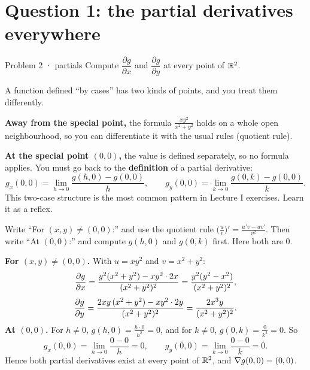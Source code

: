 \section{Question 1: the partial derivatives everywhere}

\begin{question}{Problem 2 \;·\; partials}
Compute $\dfrac{\partial g}{\partial x}$ and $\dfrac{\partial g}{\partial y}$ at every point of $\mathbb{R}^2$.
\end{question}

\begin{lesson}
A function defined ``by cases'' has two kinds of points, and you treat them differently.

\textbf{Away from the special point,} the formula $\frac{xy^2}{x^2+y^2}$ holds on a whole open
neighbourhood, so you can differentiate it with the usual rules (quotient rule).

\textbf{At the special point $(0,0)$,} the value is defined separately, so no formula applies. You
must go back to the \textbf{definition} of a partial derivative:
\[
  g_x(0,0)=\lim_{h\to0}\frac{g(h,0)-g(0,0)}{h},\qquad g_y(0,0)=\lim_{k\to0}\frac{g(0,k)-g(0,0)}{k}.
\]
This two-case structure is the most common pattern in Lecture I exercises. Learn it as a reflex.
\end{lesson}

\begin{howto}
Write ``For $(x,y)\ne(0,0)$:'' and use the quotient rule $\big(\frac uv\big)'=\frac{u'v-uv'}{v^2}$.
Then write ``At $(0,0)$:'' and compute $g(h,0)$ and $g(0,k)$ first. Here both are $0$.
\end{howto}

\begin{answer}
\textbf{For $(x,y)\ne(0,0)$.} With $u=xy^2$ and $v=x^2+y^2$:
\[
  \frac{\partial g}{\partial x}=\frac{y^2(x^2+y^2)-xy^2\cdot2x}{(x^2+y^2)^2}=\frac{y^2(y^2-x^2)}{(x^2+y^2)^2},
\]
\[
  \frac{\partial g}{\partial y}=\frac{2xy\,(x^2+y^2)-xy^2\cdot2y}{(x^2+y^2)^2}=\frac{2x^3y}{(x^2+y^2)^2}.
\]
\textbf{At $(0,0)$.} For $h\ne0$, $g(h,0)=\frac{h\cdot0}{h^2}=0$, and for $k\ne0$, $g(0,k)=\frac{0}{k^2}=0$. So
\[
  g_x(0,0)=\lim_{h\to0}\frac{0-0}{h}=0,\qquad g_y(0,0)=\lim_{k\to0}\frac{0-0}{k}=0 .
\]
Hence both partial derivatives exist at every point of $\mathbb{R}^2$, and $\nabla g(0,0)=(0,0)$.
\end{answer}


